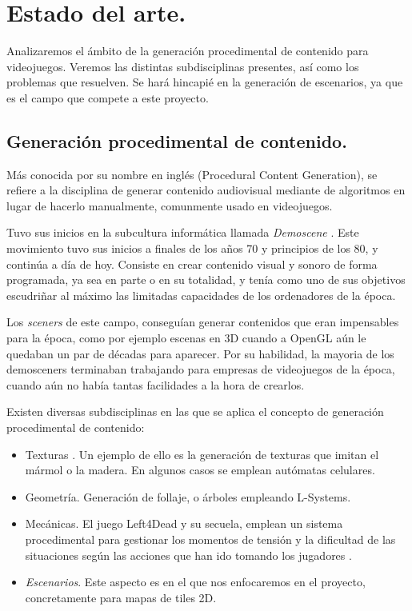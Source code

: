 \chapter{Estado del arte.}\label{cap:capitulo1}

Analizaremos el ámbito de la generación procedimental de contenido para videojuegos. Veremos las distintas subdisciplinas presentes, así como los problemas que resuelven. Se hará hincapié en la generación de escenarios, ya que es el campo que compete a este proyecto.

\section{Generación procedimental de contenido.}

Más conocida por su nombre en inglés (Procedural Content Generation), se refiere a la disciplina de generar contenido audiovisual mediante de algoritmos en lugar de hacerlo manualmente, comunmente usado en videojuegos.

Tuvo sus inicios en la subcultura informática llamada \emph{Demoscene} \cite{dmscn}. Este movimiento tuvo sus inicios a finales de los años 70 y principios de los 80, y continúa a día de hoy. Consiste en crear contenido visual y sonoro de forma programada, ya sea en parte o en su totalidad, y tenía como uno de sus objetivos escudriñar al máximo las limitadas capacidades de los ordenadores de la época.

Los \emph{sceners} de este campo, conseguían generar contenidos que eran impensables para la época, como por ejemplo escenas en 3D cuando a OpenGL aún le quedaban un par de décadas para aparecer. Por su habilidad, la mayoria de los demosceners terminaban trabajando para empresas de videojuegos de la época, cuando aún no había tantas facilidades a la hora de crearlos.

Existen diversas subdisciplinas en las que se aplica el concepto de generación procedimental de contenido:

\begin{itemize}
	\item Texturas \cite{texmodproc}. Un ejemplo de ello es la generación de texturas que imitan el mármol o la madera. En algunos casos se emplean autómatas celulares.
	\item Geometría. Generación de follaje, o árboles empleando L-Systems. \cite{texmodproc}
	\item Mecánicas. El juego Left4Dead y su secuela, emplean un sistema procedimental para gestionar los momentos de tensión y la dificultad de las situaciones según las acciones que han ido tomando los jugadores \cite{l4d2proc}.
	\item \emph{Escenarios}. Este aspecto es en el que nos enfocaremos en el proyecto, concretamente para mapas de tiles 2D.
\end{itemize}

